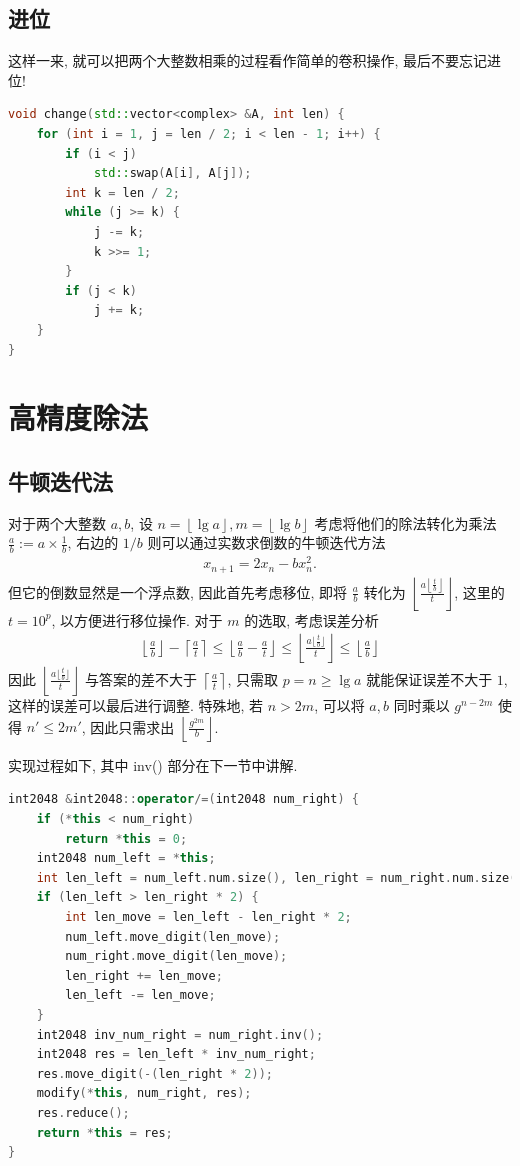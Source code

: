 \documentclass[UTF8, a4paper, 11pt]{ctexart}
\theoremstyle{definition}
\begin{document}
\subsection{进位}

这样一来, 就可以把两个大整数相乘的过程看作简单的卷积操作, 最后不要忘记进位!

\begin{lstlisting}[language=C++]
void change(std::vector<complex> &A, int len) {
    for (int i = 1, j = len / 2; i < len - 1; i++) {
        if (i < j)
            std::swap(A[i], A[j]);
        int k = len / 2;
        while (j >= k) {
            j -= k;
            k >>= 1;
        }
        if (j < k)
            j += k;
    }
}
\end{lstlisting}

\section{高精度除法}

\subsection{牛顿迭代法}
对于两个大整数 $a,b$, 设 $n=\left\lfloor\lg a\right\rfloor, m=\left\lfloor\lg b\right\rfloor$ 考虑将他们的除法转化为乘法 $\frac{a}{b}:=a\times\frac{1}{b}$, 右边的 $1/b$ 则可以通过实数求倒数的牛顿迭代方法
\begin{align*}
    x_{n+1}=2x_n-bx_n^2.
\end{align*}
但它的倒数显然是一个浮点数, 因此首先考虑移位, 即将 $\frac{a}{b}$ 转化为 $\left\lfloor\frac{a\left\lfloor\frac{t}{b}\right\rfloor}{t}\right\rfloor$, 这里的 $t=10^p$, 以方便进行移位操作. 对于 $m$ 的选取, 考虑误差分析 
\begin{align*}
\left\lfloor\frac ab\right\rfloor-\left\lceil\frac at\right\rceil\le \left\lfloor\frac ab-\frac at\right\rfloor\le \left\lfloor\frac{a\lfloor\frac tb\rfloor}t\right\rfloor\le \left\lfloor\frac ab\right\rfloor
\end{align*}
因此 $\left\lfloor\frac{a\lfloor\frac tb\rfloor}t\right\rfloor$ 与答案的差不大于 $\left\lceil\frac{a}{t}\right\rceil$, 只需取 $p=n\ge\lg a$ 就能保证误差不大于 $1$, 这样的误差可以最后进行调整. 特殊地, 若 $n>2m$, 可以将 $a,b$ 同时乘以 $g^{n-2m}$ 使得 $n'\le 2m'$, 因此只需求出 $\left\lfloor\frac {g^{2m}}b\right\rfloor$.

实现过程如下, 其中 inv() 部分在下一节中讲解.

\begin{lstlisting}[language=C++]
int2048 &int2048::operator/=(int2048 num_right) {
    if (*this < num_right)
        return *this = 0;
    int2048 num_left = *this;
    int len_left = num_left.num.size(), len_right = num_right.num.size();
    if (len_left > len_right * 2) {
        int len_move = len_left - len_right * 2;
        num_left.move_digit(len_move);
        num_right.move_digit(len_move);
        len_right += len_move;
        len_left -= len_move;
    }
    int2048 inv_num_right = num_right.inv();
    int2048 res = len_left * inv_num_right;
    res.move_digit(-(len_right * 2));
    modify(*this, num_right, res);
    res.reduce();
    return *this = res;
}
\end{lstlisting}
\end{document}
